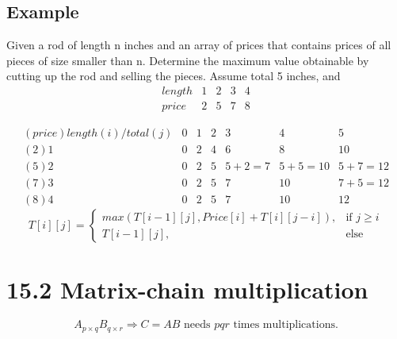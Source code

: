 \documentclass[a4paper]{article}
\begin{document}
\subsection*{Example}
Given a rod of length n inches and an array of prices that contains prices of all pieces of size smaller than n. Determine the maximum value obtainable by cutting up the rod and selling the pieces. Assume total 5 inches, and
    $$
    \begin{array}{c|cccc}
    length & 1 & 2 & 3 & 4\\
    \hline
    price & 2 & 5 & 7 & 8
    \end{array}
    $$
    
    $$
    \begin{array}{c|cccccc}
    (price)length(i)/total(j)& 0 & 1 & 2 & 3 & 4 & 5\\
    \hline
    (2)1 & 0 & 2 & 4 & 6 & 8 & 10 \\
    (5)2 & 0 & 2 & 5 & 5+2=7 & 5+5=10 & 5+7=12 \\
    (7)3 & 0 & 2 & 5 & 7 & 10 & 7+5=12 \\
    (8)4 & 0 & 2 & 5 & 7 & 10 & 12
    \end{array}
    $$
    $$
    T[i][j]=
        \begin{cases}
        max(T[i-1][j], Price[i]+ T[i][j-i]),  & \text{if $j \geq i$} \\
        T[i-1][j], & \text{else}
        \end{cases}
    $$
    
\section*{15.2 Matrix-chain multiplication}
$$A_{p\times q} B_{q\times r}\Rightarrow C=AB \text{ needs } pqr \text{ times multiplications.}$$
\end{document}
